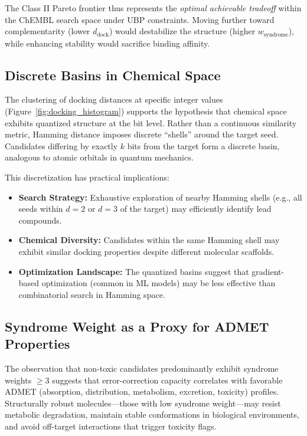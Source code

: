 \documentclass[12pt,a4paper]{article}
\begin{document}
The Class II Pareto frontier thus represents the \textit{optimal achievable tradeoff} within the ChEMBL search space under UBP constraints. Moving further toward complementarity (lower $d_{\text{dock}}$) would destabilize the structure (higher $w_{\text{syndrome}}$), while enhancing stability would sacrifice binding affinity.

\subsection{Discrete Basins in Chemical Space}

The clustering of docking distances at specific integer values (Figure~\ref{fig:docking_histogram}) supports the hypothesis that chemical space exhibits quantized structure at the bit level. Rather than a continuous similarity metric, Hamming distance imposes discrete ``shells'' around the target seed. Candidates differing by exactly $k$ bits from the target form a discrete basin, analogous to atomic orbitals in quantum mechanics.

This discretization has practical implications:

\begin{itemize}
\item \textbf{Search Strategy:} Exhaustive exploration of nearby Hamming shells (e.g., all seeds within $d = 2$ or $d = 3$ of the target) may efficiently identify lead compounds.
\item \textbf{Chemical Diversity:} Candidates within the same Hamming shell may exhibit similar docking properties despite different molecular scaffolds.
\item \textbf{Optimization Landscape:} The quantized basins suggest that gradient-based optimization (common in ML models) may be less effective than combinatorial search in Hamming space.
\end{itemize}

\subsection{Syndrome Weight as a Proxy for ADMET Properties}

The observation that non-toxic candidates predominantly exhibit syndrome weights $\geq 3$ suggests that error-correction capacity correlates with favorable ADMET (absorption, distribution, metabolism, excretion, toxicity) profiles. Structurally robust molecules---those with low syndrome weight---may resist metabolic degradation, maintain stable conformations in biological environments, and avoid off-target interactions that trigger toxicity flags.
\end{document}
